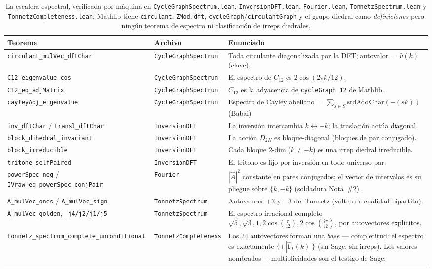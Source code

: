 \documentclass[11pt]{article}
\newcommand{\lean}[1]{\texttt{#1}}
\newcommand{\Ahat}{\hat{A}}
\begin{document}
\begin{table}[!ht]
\centering\footnotesize
\setlength{\tabcolsep}{4pt}
\begin{tabular}{@{}p{} p{} p{}@{}}
\toprule
\rowcolor{ctA!22}
\textbf{Teorema} & \textbf{Archivo} & \textbf{Enunciado}\\
\midrule
\lean{circulant\_mulVec\_dftChar} & \lean{CycleGraphSpectrum} & Toda circulante diagonalizada por la DFT; autovalor $=\hat v(k)$ (clave).\\
\lean{C12\_eigenvalue\_cos} & \lean{CycleGraphSpectrum} & El espectro de $C_{12}$ es $2\cos(2\pi k/12)$.\\
\lean{C12\_eq\_adjMatrix} & \lean{CycleGraphSpectrum} & $C_{12}$ es la adyacencia de \texttt{cycleGraph 12} de Mathlib.\\
\lean{cayleyAdj\_eigenvalue} & \lean{CycleGraphSpectrum} & Espectro de Cayley abeliano $=\sum_{s\in S}\mathrm{stdAddChar}(-(sk))$ (Babai).\\
\lean{inv\_dftChar} / \lean{transl\_dftChar} & \lean{InversionDFT} & La inversi\'on intercambia $k\leftrightarrow-k$; la traslaci\'on act\'ua diagonal.\\
\lean{block\_dihedral\_invariant} & \lean{InversionDFT} & La acci\'on $D_{2N}$ es bloque-diagonal (bloques de par conjugado).\\
\lean{block\_irreducible} & \lean{InversionDFT} & Cada bloque $2$-dim ($k\neq-k$) es una irrep diedral irreducible.\\
\lean{tritone\_selfPaired} & \lean{InversionDFT} & El tritono es fijo por inversi\'on en todo universo par.\\
\lean{powerSpec\_neg} / \lean{IVraw\_eq\_powerSpec\_conjPair} & \lean{Fourier} & $|\Ahat|^2$ constante en pares conjugados; el vector de intervalos es su pliegue sobre $\{k,-k\}$ (soldadura Nota~\#2).\\
\lean{A\_mulVec\_ones} / \lean{A\_mulVec\_sign} & \lean{TonnetzSpectrum} & Autovalores $+3$ y $-3$ del Tonnetz (volteo de cualidad bipartito).\\
\lean{A\_mulVec\_golden}, \lean{\_j4/j2/j1/j5} & \lean{TonnetzSpectrum} & El espectro irracional completo $\sqrt5,\sqrt3,1,2\cos(\tfrac{\pi}{12}),2\cos(\tfrac{5\pi}{12})$, por autovectores expl\'icitos.\\
\lean{tonnetz\_spectrum\_\allowbreak complete\_\allowbreak unconditional} & \lean{TonnetzCompleteness} & Los $24$ autovectores forman una \emph{base} --- completitud: el espectro es exactamente $\{\pm|\hat{\mathbf 1}_T(k)|\}$ (sin Sage, sin irreps). Los valores nombrados + multiplicidades son el testigo de Sage.\\
\bottomrule
\end{tabular}
\caption{La escalera espectral, verificada por m\'aquina en \lean{CycleGraphSpectrum.lean},
\lean{InversionDFT.lean}, \lean{Fourier.lean}, \lean{TonnetzSpectrum.lean} y \lean{TonnetzCompleteness.lean}. Mathlib tiene \lean{circulant},
\lean{ZMod.dft}, \lean{cycleGraph}/\lean{circulantGraph} y el grupo diedral como \emph{definiciones} pero
ning\'un teorema de espectro ni clasificaci\'on de irreps diedrales.}
\label{tab:lean}
\end{table}
\end{document}
